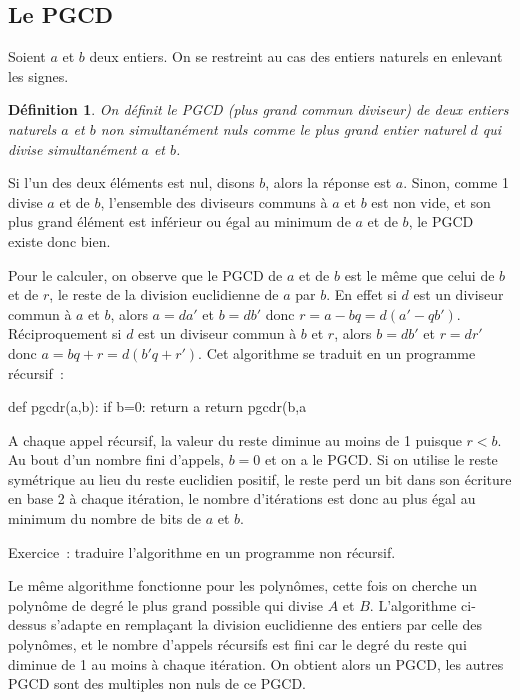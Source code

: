 \documentclass[a4paper,11pt]{book}
\newtheorem{defn}[thm]{D\'efinition}
\begin{document}
\begin{giacjshere}
\subsection{Le PGCD}
Soient $a$ et $b$ deux entiers. On se restreint au cas des entiers naturels en
enlevant les signes.
\begin{defn}
On d\'efinit le PGCD (plus grand commun diviseur)
de deux entiers naturels $a$ et $b$ 
non simultan\'ement nuls
comme le plus grand entier naturel
$d$ qui divise simultan\'ement $a$ et $b$.
\end{defn}
Si l'un des deux \'el\'ements est nul, disons $b$, alors la r\'eponse
est $a$.
Sinon, comme 1 divise $a$ et de $b$, l'ensemble
des diviseurs communs \`a $a$ et $b$ est non vide, et son plus grand
\'el\'ement est inf\'erieur ou \'egal au minimum de $a$ et de $b$, le PGCD existe
donc bien.

Pour le calculer, on observe que le PGCD de $a$ et de $b$ est le
m\^eme que celui de $b$ et de $r$, le reste de la division euclidienne de
$a$ par $b$. En effet si $d$ est un diviseur commun \`a $a$ et $b$,
alors $a=da'$ et $b=db'$ donc $r=a-bq=d(a'-qb')$. R\'eciproquement
si $d$ est un diviseur commun \`a $b$ et $r$, alors
$b=db'$ et $r=dr'$ donc $a=bq+r=d(b'q+r')$. Cet algorithme
se traduit en un programme r\'ecursif~:
\begin{giaconload}
def pgcdr(a,b):
     if b=0: return a
     return pgcdr(b,a %
\end{giaconload}
A chaque appel r\'ecursif, la valeur du reste diminue au moins de 1 puisque $r<b$.
Au bout d'un nombre fini d'appels, $b=0$ et on a le PGCD.
Si on utilise le reste sym\'etrique au lieu du reste euclidien
positif, le reste perd un bit dans son \'ecriture en base 2 \`a chaque
it\'eration, le nombre d'it\'erations est donc au plus \'egal au minimum
du nombre de bits de $a$ et $b$.

Exercice~: traduire l'algorithme en un programme non r\'ecursif.

Le m\^eme algorithme fonctionne pour les polyn\^omes, cette fois on
cherche un polyn\^ome de degr\'e le plus grand possible qui divise
$A$ et $B$. L'algorithme ci-dessus s'adapte en rempla\c{c}ant
la division euclidienne des entiers par celle des polyn\^omes, et
le nombre d'appels r\'ecursifs est fini car
le degr\'e du reste qui diminue de 1 au moins \`a chaque it\'eration.
On obtient alors un PGCD, les autres PGCD sont des multiples non nuls
de ce PGCD.


\end{giacjshere}
\end{document}
